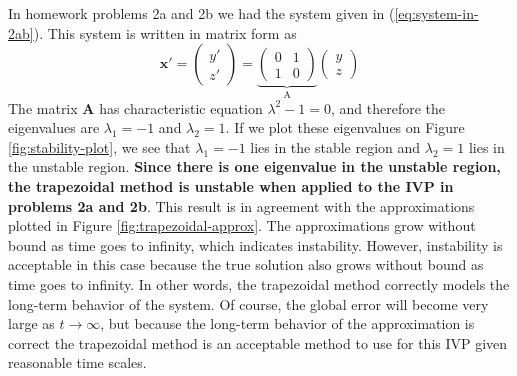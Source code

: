 \documentclass{article}
\begin{document}
In homework problems 2a and 2b we had the system given in (\ref{eq:system-in-2ab}).  This system is written in matrix form as
\begin{equation}
\bm{x}' = \begin{pmatrix}y' \\ z'\end{pmatrix} = \underbrace{\begin{pmatrix}0 & 1 \\ 1 & 0\end{pmatrix}}_\text{A}\begin{pmatrix}y \\ z\end{pmatrix}
\end{equation}
The matrix $\bm{A}$ has characteristic equation $\lambda^2 - 1 = 0$, and therefore the eigenvalues are $\lambda_1 = -1$ and $\lambda_2 = 1$.  If we plot these eigenvalues on Figure \ref{fig:stability-plot}, we see that $\lambda_1 = -1$ lies in the stable region and $\lambda_2 = 1$ lies in the unstable region. \textbf{Since there is one eigenvalue in the unstable region, the trapezoidal method is unstable when applied to the IVP in problems 2a and 2b}. This result is in agreement with the approximations plotted in Figure \ref{fig:trapezoidal-approx}. The approximations grow without bound as time goes to infinity, which indicates instability.  However, instability is acceptable in this case because the true solution also grows without bound as time goes to infinity. In other words, the trapezoidal method correctly models the long-term behavior of the system.  Of course, the global error will become very large as $t \rightarrow \infty$, but because the long-term behavior of the approximation is correct the trapezoidal method is an acceptable method to use for this IVP given reasonable time scales.
\end{document}
